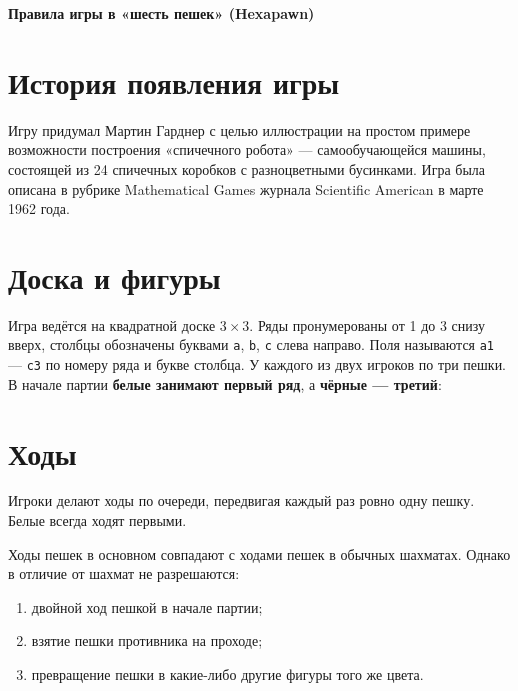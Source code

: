\documentclass[12pt,a4paper]{article}
\begin{document}
\begin{center}
{\LARGE\bfseries Правила игры в «шесть пешек» (Hexapawn)}\\[0.6em]
\end{center}


\section*{История появления игры}

Игру придумал Мартин Гарднер с целью иллюстрации на простом примере возможности построения «спичечного робота» ---
самообучающейся машины, состоящей из 24 спичечных коробков с разноцветными бусинками.
Игра была описана в рубрике Mathematical Games журнала Scientific American в марте 1962 года.


\section*{Доска и фигуры}

Игра ведётся на квадратной доске $3\times3$.
Ряды пронумерованы от 1 до 3 снизу вверх, столбцы обозначены буквами \texttt{a}, \texttt{b}, \texttt{c} слева направо.
Поля называются \texttt{a1} --- \texttt{c3} по номеру ряда и букве столбца.
У каждого из двух игроков по три пешки.
В начале партии \textbf{белые занимают первый ряд}, а \textbf{чёрные --- третий}:

\begin{center}
\end{center}


\section*{Ходы}

Игроки делают ходы по очереди, передвигая каждый раз ровно одну пешку.
Белые всегда ходят первыми.

Ходы пешек в основном совпадают с ходами пешек в обычных шахматах.
Однако в отличие от шахмат не разрешаются:

\begin{enumerate}[nosep]
\item двойной ход пешкой в начале партии;
\item взятие пешки противника на проходе;
\item превращение пешки в какие-либо другие фигуры того же цвета.
\end{enumerate}

\newpage
\end{document}
